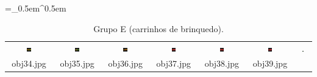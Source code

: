 \begin{table}[H]
  \centering
  \caption{Grupo E (carrinhos de brinquedo).}
  \tabulinesep =_0.5em^0.5em
  \everyrow{\tabucline[0.4pt]-}
  \begin{tabu}{|ccccccc|}
    \includegraphics[width=0.1\textwidth,height=0.1\textwidth]{imagens/coil_100/carrinhos_brinquedos/obj6__0.png} &
    \includegraphics[width=0.1\textwidth,height=0.1\textwidth]{imagens/coil_100/carrinhos_brinquedos/obj8__0.png} &
    \includegraphics[width=0.1\textwidth,height=0.1\textwidth]{imagens/coil_100/carrinhos_brinquedos/obj15__0.png} &
    \includegraphics[width=0.1\textwidth,height=0.1\textwidth]{imagens/coil_100/carrinhos_brinquedos/obj19__0.png} &
    \includegraphics[width=0.1\textwidth,height=0.1\textwidth]{imagens/coil_100/carrinhos_brinquedos/obj19__0_1.png} &
    \includegraphics[width=0.1\textwidth,height=0.1\textwidth]{imagens/coil_100/carrinhos_brinquedos/obj23__0.png} &
    \includegraphics[width=0.1\textwidth,height=0.1\textwidth]{imagens/coil_100/carrinhos_brinquedos/obj27__0.png}
    \\
    \scriptsize{obj34.jpg} & \scriptsize{obj35.jpg} & \scriptsize{obj36.jpg} &
    \scriptsize{obj37.jpg} & \scriptsize{obj38.jpg} & \scriptsize{obj39.jpg} &

\end{tabu}
\end{table}
